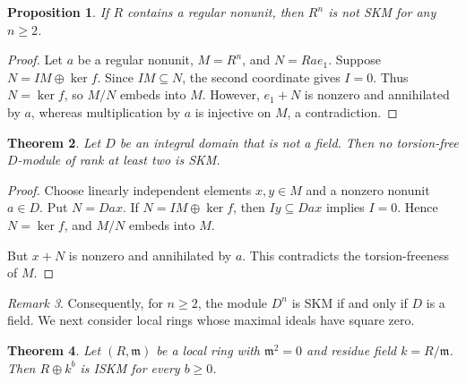 \documentclass[11pt,a4paper]{article}
\newtheorem{theorem}{Theorem}[section]
\newtheorem{proposition}[theorem]{Proposition}
\theoremstyle{definition}
\theoremstyle{remark}
\newtheorem{remark}[theorem]{Remark}
\begin{document}
\begin{proposition}
If $R$ contains a regular nonunit, then $R^n$ is not SKM for any $n\geq2$.
\end{proposition}

\begin{proof}
Let $a$ be a regular nonunit, $M=R^n$, and $N=Ra e_1$. Suppose $N=IM\oplus\ker f$. Since $IM\subseteq N$, the second coordinate gives $I=0$. Thus $N=\ker f$, so $M/N$ embeds into $M$. However, $e_1+N$ is nonzero and annihilated by $a$, whereas multiplication by $a$ is injective on $M$, a contradiction.
\end{proof}

\begin{theorem} 
\label{thm:rank}
Let $D$ be an integral domain that is not a field. Then no torsion-free $D$-module of rank at least two is SKM.
\end{theorem}

\begin{proof}
Choose linearly independent elements $x,y\in M$ and a nonzero nonunit $a\in D$. Put $N=Dax$. If $N=IM\oplus\ker f$, then $Iy\subseteq Dax$ implies $I=0$. Hence $N=\ker f$, and $M/N$ embeds into $M$.

But $x+N$ is nonzero and annihilated by $a$. This contradicts the torsion-freeness of $M$.
\end{proof}

\begin{remark}
Consequently, for $n\geq2$, the module $D^n$ is SKM if and only if $D$ is a field. We next consider local rings whose maximal ideals have square zero.
\end{remark}

\begin{theorem} 
\label{thm:construct}
Let $(R,\mathfrak m)$ be a local ring with $\mathfrak m^2=0$ and residue field $k=R/\mathfrak m$. Then $R\oplus k^b$ is ISKM for every $b\geq0$.
\end{theorem}
\end{document}
